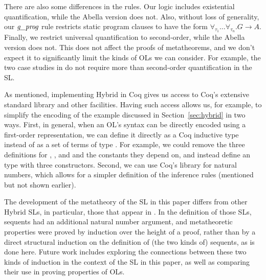 There are also some differences in the rules.  Our logic includes
existential quantification, while the Abella version does not.  Also,
without loss of generality, our $\textit{g\_prog}$ rule restricts static
program clauses to have the form
$\forall_{\tau_1}\ldots\forall_{\tau_n}.G\longrightarrow A$.  Finally,
we restrict universal quantification to second-order, while the Abella
version does not.  This does not affect the proofs of metatheorems,
and we don't expect it to significantly limit the kinds of OLs we can
consider.  For example, the two case studies in \cite{WCGN:PPDP13} do
not require more than second-order quantification in the SL.

As mentioned, implementing Hybrid in Coq gives us access to Coq's
extensive standard library and other facilities.  Having such access
allows us, for example, to simplify the encoding of the example
discussed in Section~\ref{sec:hybrid} in two ways.  First, in general,
when an OL's syntax can be directly encoded using a first-order
representation, we can define it directly as a Coq inductive type
instead of as a set of terms of type .  For example, we
could remove the three definitions for , , and
 and the constants they depend on, and instead define an
type  with three constructors.
Second, we can use Coq's library for natural numbers, which allows for
a simpler definition of the  inference rules (mentioned but
not shown earlier).

The development of the metatheory of the SL in this paper differs from
other Hybrid SLs, in particular, those that appear in
\cite{FeltyMomigliano:JAR10}.  In the definition of those SLs,
sequents had an additional natural number argument, and metatheoretic
properties were proved by induction over the height of a proof, rather
than by a direct structural induction on the definition of (the two
kinds of) sequents, as is done here.  Future work includes exploring
the connections between these two kinds of induction in the context of
the SL in this paper, as well as comparing their use in proving
properties of OLs.

